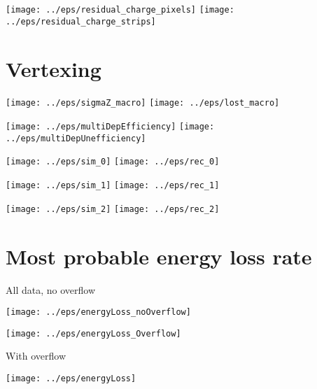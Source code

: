 \documentclass[a4paper]{article}
\begin{document}
\begin{center}
 \texttt{[image: ../eps/residual\_charge\_pixels]}
 \texttt{[image: ../eps/residual\_charge\_strips]}
\end{center}

\newpage

\section{Vertexing}

\begin{center}
 \texttt{[image: ../eps/sigmaZ\_macro]}
 \texttt{[image: ../eps/lost\_macro]}
\end{center}

\begin{center}
 \texttt{[image: ../eps/multiDepEfficiency]}
 \texttt{[image: ../eps/multiDepUnefficiency]}
\end{center}

\newpage

\begin{center}
 \texttt{[image: ../eps/sim\_0]}
 \texttt{[image: ../eps/rec\_0]}

 \texttt{[image: ../eps/sim\_1]}
 \texttt{[image: ../eps/rec\_1]}

 \texttt{[image: ../eps/sim\_2]}
 \texttt{[image: ../eps/rec\_2]}
\end{center}

\newpage

\section{Most probable energy loss rate}

All data, no overflow

\begin{center}
 \texttt{[image: ../eps/energyLoss\_noOverflow]}

 \texttt{[image: ../eps/energyLoss\_Overflow]}
\end{center}

\newpage

With overflow

\begin{center}
 \texttt{[image: ../eps/energyLoss]}
\end{center}
\end{document}
